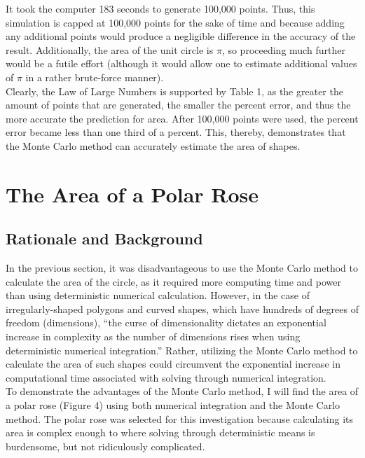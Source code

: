 \documentclass[11pt]{article}
\begin{document}
It took the computer 183 seconds to generate 100,000 points. Thus, this simulation is capped at 100,000 points for the sake of time and because adding any additional points would produce a negligible difference in the accuracy of the result. Additionally, the area of the unit circle is $\pi$, so proceeding much further would be a futile effort (although it would allow one to estimate additional values of $\pi$ in a rather brute-force manner).\\[3ex]

Clearly, the Law of Large Numbers is supported by Table 1, as the greater the amount of points that are generated, the smaller the percent error, and thus the more accurate the prediction for area. After 100,000 points were used, the percent error became less than one third of a percent.  This, thereby, demonstrates that the Monte Carlo method can accurately estimate the area of shapes.\\


\section{The Area of a Polar Rose}
\subsection{Rationale and Background}

In the previous section, it was disadvantageous to use the Monte Carlo method to calculate the area of the circle, as it required more computing time and power than using deterministic numerical calculation. However, in the case of irregularly-shaped polygons and curved shapes, which have hundreds of degrees of freedom (dimensions), “the curse of dimensionality dictates an exponential increase in complexity as the number of dimensions rises when using deterministic numerical integration.”\cite{dynamicprogramming} Rather, utilizing the Monte Carlo method to calculate the area of such shapes could circumvent the exponential increase in computational time associated with solving through numerical integration. \\[3ex]

To demonstrate the advantages of the Monte Carlo method, I will find the area of a polar rose (Figure 4) using both numerical integration and the Monte Carlo method. The polar rose was selected for this investigation because calculating its area is complex enough to where solving through deterministic means is burdensome, but not ridiculously complicated. 
\end{document}
